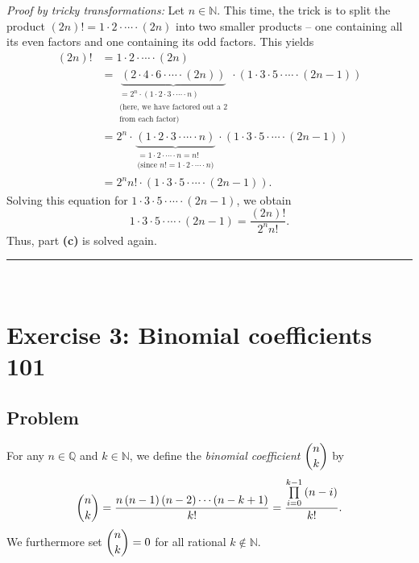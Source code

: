 \documentclass[paper=a4, fontsize=12pt]{scrartcl} %
\newcommand{\QQ}{\mathbb{Q}} %
\newcommand{\NN}{\mathbb{N}} %
\newcommand{\tup}[1]{\left( #1 \right)}
\newcommand{\underbrack}[2]{\underbrace{#1}_{\substack{#2}}}
\newcommand{\horrule}[1]{\rule{\linewidth}{#1}} %
\let\prodnonlimits\prod
\renewcommand{\prod}{\prodnonlimits\limits}
\theoremstyle{plainsl}
\theoremstyle{definition}
\theoremstyle{remark}
\begin{document}
\textit{Proof by tricky transformations:} Let $n \in \NN$. This time,
the trick is to split the product
$\tup{2n}! = 1\cdot 2\cdot \cdots \cdot \tup{2n}$ into two smaller products
-- one containing all its even factors and one containing its odd factors.
This yields
\begin{align*}
\tup{2n}!
& = 1\cdot 2\cdot \cdots \cdot \tup{2n} \\
& = \underbrack{\tup{ 2\cdot 4\cdot 6\cdot \cdots \cdot \tup{2n} }}
               {= 2^n \cdot \tup{ 1\cdot 2\cdot 3\cdot \cdots \cdot n} \\
                \text{(here, we have factored out a $2$} \\
                \text{from each factor)}}
    \cdot \tup{ 1\cdot 3\cdot 5\cdot \cdots \cdot \tup{2n - 1} } \\
& = 2^n \cdot \underbrack{\tup{ 1\cdot 2\cdot 3\cdot \cdots \cdot n }}
                         {= 1\cdot 2\cdot \cdots \cdot n = n! \\
                          \text{(since $n! = 1\cdot 2\cdot \cdots \cdot n$)}}
    \cdot \tup{ 1\cdot 3\cdot 5\cdot \cdots \cdot \tup{2n - 1} } \\
& = 2^n n! \cdot \tup{ 1\cdot 3\cdot 5\cdot \cdots \cdot \tup{2n - 1} } .
\end{align*}
Solving this equation for $1\cdot 3\cdot 5\cdot \cdots \cdot \tup{2n - 1}$,
we obtain
\[
1\cdot 3\cdot 5\cdot \cdots \cdot \tup{2n - 1}
= \dfrac{\tup{2n}!}{2^n n!}.
\]
Thus, part \textbf{(c)} is solved again.

\horrule{0.3pt} \\[0.4cm]

\section{Exercise 3: Binomial coefficients 101}

\subsection{Problem}

For any $n \in \QQ$ and $k \in \NN$, we define the
\textit{binomial coefficient} $\dbinom{n}{k}$ by
\[
\dbinom{n}{k}
= \dfrac{ n \tup{n-1} \tup{n-2} \cdots \tup{n-k+1} }{k!}
= \dfrac{ \prod_{i=0}^{k-1} \tup{n-i} }{k!} .
\]
We furthermore set $\dbinom{n}{k} = 0$ for all rational
$k \notin \NN$.
\end{document}
